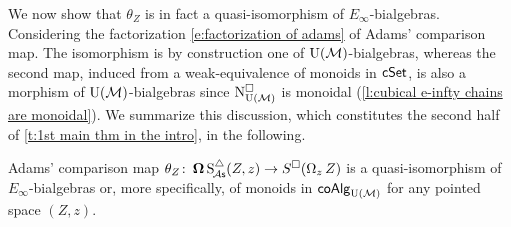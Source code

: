 We now show that $\theta_Z$ is in fact a quasi-isomorphism of $E_{\infty}$-bialgebras.
Considering the factorization \eqref{e:factorization of adams} of Adams' comparison map.
The isomorphism is by construction one of ${\operatorname{U}(\mathcal{M})}$-bialgebras, whereas the second map, induced from a weak-equivalence of monoids in $\mathsf{cSet}$, is also a morphism of ${\operatorname{U}(\mathcal{M})}$-bialgebras
since $\operatorname{N^{\square}_{{\operatorname{U}(\mathcal{M})}}}$ is monoidal (\cref{l:cubical e-infty chains are monoidal}).
We summarize this discussion, which constitutes the second half of \cref{t:1st main thm in the intro}, in the following.

\begin{lemma} \label{l:adams comparison is an e-infty bialgebra map}
	Adams' comparison map $\theta_Z \colon \operatorname{\mathbf{\Omega}} \operatorname{S^{\triangle}_{\!{\mathcal{A}\mathsf{s}}}}(Z, z) \to S^{\square}(\operatorname{\Omega}_z Z)$ is a quasi-isomorphism of $E_{\infty}$-bialgebras or, more specifically, of monoids in $\mathsf{coAlg}_{\operatorname{U}(\mathcal{M})}$ for any pointed space $(Z, z)$.
\end{lemma}
